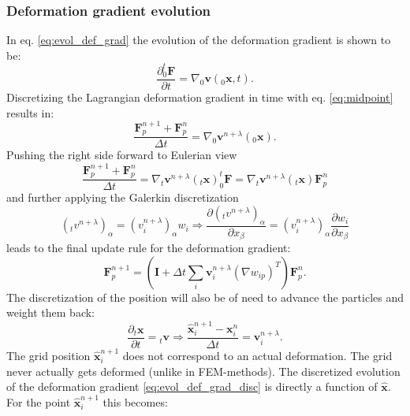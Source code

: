 \documentclass[m,times]{cgMA}
\begin{document}
\subsubsection{Deformation gradient evolution}
In eq. \ref{eq:evol_def_grad} the evolution of the deformation gradient is shown to be:
\begin{equation}
  \frac{\partial ^t_0\boldsymbol{F}}{\partial t} =  \nabla{_0\boldsymbol{v}}(_0\boldsymbol{x},t).
\end{equation}
Discretizing the Lagrangian deformation gradient in time with eq. \ref{eq:midpoint} results in:
\begin{equation}
  \frac{\boldsymbol{F}^{n+1}_p + \boldsymbol{F}^{n}_p}{\Delta t} =  \nabla_0\boldsymbol{v}^{n+\lambda}(_0\boldsymbol{x}).
\end{equation}
Pushing the right side forward to Eulerian view
\begin{equation}
  \frac{\boldsymbol{F}^{n+1}_p + \boldsymbol{F}^{n}_p}{\Delta t} =  \nabla_t\boldsymbol{v}^{n+\lambda}(_t\boldsymbol{x})^t_0\boldsymbol{F} = \nabla_t\boldsymbol{v}^{n+\lambda}(_t\boldsymbol{x})\boldsymbol{F}^n_p
\end{equation}
and further applying the Galerkin discretization
\begin{equation}
  (_tv^{n+\lambda})_\alpha = (v_{i}^{n+\lambda})_\alpha w_i \Rightarrow \frac{\partial (_tv^{n+\lambda})_\alpha}{\partial x_\beta} =(v_i^{n+\lambda})_\alpha\frac{\partial w_i}{\partial x_\beta}
\end{equation}
leads to the final update rule for the deformation gradient:
\begin{equation}\label{eq:evol_def_grad_disc}
\boldsymbol{F}^{n+1}_p = \left( \boldsymbol{I} + \Delta t\sum_i \boldsymbol{v}_i^{n+\lambda}({\nabla w_{ip}})^T \right)\boldsymbol{F}^{n}_p.
\end{equation}
The discretization of the position will also be of need to advance the particles and weight them back:
\begin{equation}  \frac{\partial _t\boldsymbol{x}}{\partial t} = {_t\boldsymbol{v}} \Rightarrow \frac{\boldsymbol{\hat{x}}_i^{n+1}
  - \boldsymbol{x}_i^{n}}{\Delta t} = \boldsymbol{v}_i^{n+\lambda}.
\end{equation}
The grid position $\boldsymbol{\hat{x}}_i^{n+1}$ does not correspond to an actual deformation. The grid never actually gets deformed (unlike in FEM-methods). The discretized evolution of the deformation gradient  \ref{eq:evol_def_grad_disc} is directly a function of $\boldsymbol{\hat{x}}$. For the point $\boldsymbol{\hat{x}}_i^{n+1}$ this becomes:
\end{document}
